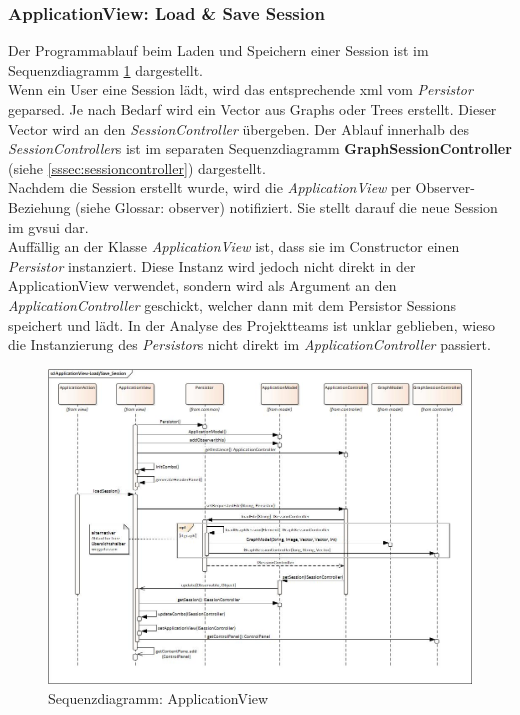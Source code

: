 \documentclass[11pt,a4paper,english,oneside]{book}
\numberwithin{equation}{chapter}
\begin{document}
	\subsubsection{ApplicationView: Load \& Save Session} \label{sssec:appView}
	Der Programmablauf beim Laden und Speichern einer Session ist im Sequenzdiagramm \ref{fig:sd-applicationview} dargestellt. \\
	Wenn ein User eine Session lädt, wird das entsprechende \gls{xml} vom \textit{Persistor} geparsed. Je nach Bedarf wird ein Vector aus Graphs oder Trees erstellt. Dieser Vector wird an den \textit{SessionController} übergeben. Der Ablauf innerhalb des \textit{SessionController}s ist im separaten Sequenzdiagramm \textbf{GraphSessionController} (siehe \ref{sssec:sessioncontroller}) dargestellt. \\
	Nachdem die Session erstellt wurde, wird die \textit{ApplicationView} per Observer-Beziehung (siehe Glossar: \gls{observer}) notifiziert. Sie stellt darauf die neue Session im \gls{gvsui} dar.\\
	Auffällig an der Klasse \textit{ApplicationView} ist, dass sie im Constructor einen \textit{Persistor} instanziert. Diese Instanz wird jedoch nicht direkt in der ApplicationView verwendet, sondern wird als Argument an den \textit{ApplicationController} geschickt, welcher dann mit dem Persistor Sessions speichert und lädt. In der Analyse des Projektteams ist unklar geblieben, wieso die Instanzierung des \textit{Persistor}s nicht direkt im \textit{ApplicationController} passiert.
	\begin{figure}[h!]
		\centering
		\includegraphics[width=\linewidth]{assets/images/application_view}
		\caption{Sequenzdiagramm: ApplicationView}
		\label{fig:sd-applicationview}
	\end{figure}
\end{document}
